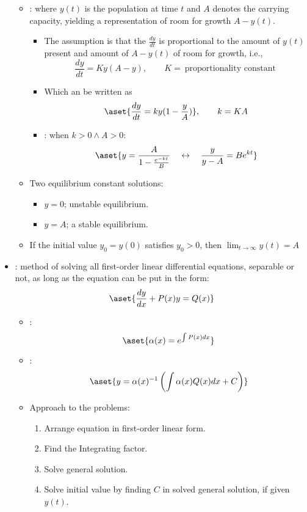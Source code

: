 \begin{itemize}
\begin{itemize}
  \item {}: where \(y(t)\) is the population
    at time \(t\) and \(A\) denotes the carrying capacity, yielding a
    representation of room for growth \(A-y (t) \).
    \begin{itemize}
      \item The assumption is that the \(\frac{dy}{dt} \) is proportional to
        the amount of \(y (t) \) present and amount of \(A - y (t) \) of room
        for growth, i.e.,
        \[%
          \frac{dy}{dt} = Ky(A-y), \qquad K = ~\text{proportionality constant}~
        \]%
      \item Which an be written as
        \[%
          \aset{\frac{dy}{dt} = ky(1-\frac{y}{A})}, \qquad k = KA
        \]%
      \item {}: when \(k > 0 \land A > 0\):
        \[%
          \aset{y = \frac{A}{1-\frac{e^{-kt}}{B}}
          \quad\leftrightarrow\quad
        \frac{y}{y-A} = Be^{kt}}
        \]%
    \end{itemize}

  \item Two equilibrium constant solutions:
    \begin{itemize}
      \item \( y= 0\); unstable equilibrium.
      \item \(y=A\); a stable equilibrium.
    \end{itemize}

  \item If the initial value \(y_0 = y(0) \) satisfies \(y_0 > 0\), then
    \(\lim_{t \to \infty} y (t) = A\)
  \end{itemize}
  \newpage

  \item {}: method of solving all first-order
    linear differential equations, separable or not, as long as the equation
    can be put in the form:
    \[%
      \aset{\frac{dy}{dx} + P(x)y = Q(x)}
    \]%
    \begin{itemize}
      \item {}:
        \[%
          \aset{\alpha (x) = e^{\int P(x) dx}}
        \]%
      \item {}:
        \[%
          \aset{y = \alpha (x)^{-1} \left( \int \alpha (x) Q (x) dx + C \right)}
        \]%
      \item Approach to the problems:
        \begin{enumerate}
          \item Arrange equation in first-order linear form.
          \item Find the Integrating factor.
          \item Solve general solution.
          \item Solve initial value by finding \(C\) in solved general
            solution, if given \(y(t)\).
        \end{enumerate}
    \end{itemize}

\end{itemize}
